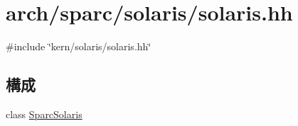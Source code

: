 \hypertarget{arch_2sparc_2solaris_2solaris_8hh}{
\section{arch/sparc/solaris/solaris.hh}
\label{arch_2sparc_2solaris_2solaris_8hh}
}
{\ttfamily \#include \char`\"{}kern/solaris/solaris.hh\char`\"{}}\par
\subsection*{構成}
\begin{DoxyCompactItemize}
\item 
class \hyperlink{classSparcSolaris}{SparcSolaris}
\end{DoxyCompactItemize}
